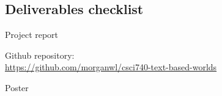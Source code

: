 
\newcommand{\cmark}{\ding{51}}
\newcommand{\xmark}{\ding{55}}
\newcommand{\done}{%
    \rlap{$\square$}{\raisebox{2pt}{\large\hspace{1pt}\cmark}}%
    \hspace{-2.5pt}}

\subsection*{Deliverables checklist}

\begin{todolist}
    \item Project report
    \item[\done]
        Github repository:\\
        \url{https://github.com/morganwl/csci740-text-based-worlds}
    \item Poster
\end{todolist}
